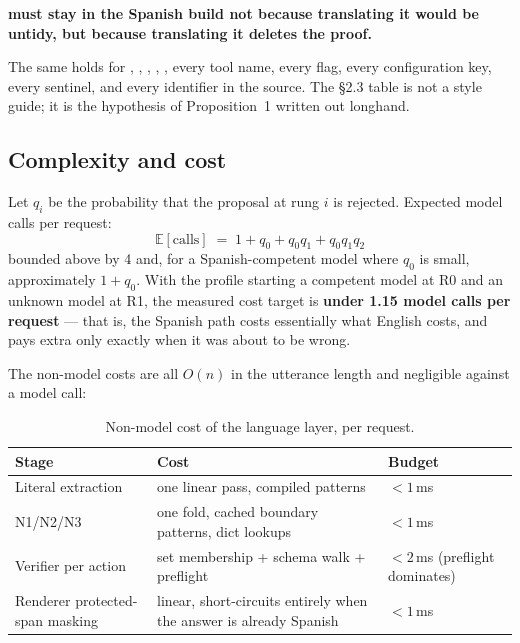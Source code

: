 \begin{keyinsight}
\textbf{ must stay  in the Spanish build not because
translating it would be untidy, but because translating it deletes the proof.}
\end{keyinsight}

The same holds for , , ,
, , every tool name, every flag, every
configuration key, every sentinel, and every identifier in the source. The
\S2.3 table is not a style guide; it is the hypothesis of Proposition~1 written
out longhand.

\subsection{Complexity and cost}
\label{sec:complexity-and-cost}

Let $q_i$ be the probability that the proposal at rung $i$ is rejected. Expected
model calls per request:
\[
  \mathbb{E}[\text{calls}] \;=\; 1 + q_{0} + q_{0}q_{1} + q_{0}q_{1}q_{2}
\]
bounded above by 4 and, for a Spanish-competent model where $q_0$ is small,
approximately $1 + q_0$. With the profile starting a competent model at R0 and
an unknown model at R1, the measured cost target is \textbf{under 1.15 model
calls per request} --- that is, the Spanish path costs essentially what English
costs, and pays extra only exactly when it was about to be wrong.

The non-model costs are all $O(n)$ in the utterance length and negligible
against a model call:

\begin{table}[htbp]
\centering
\small
\caption{Non-model cost of the language layer, per request.}
\label{tab:nepantla-cost}
\begin{tabular}{@{}>{\raggedright\arraybackslash}p{}
                  >{\raggedright\arraybackslash}p{}
                  >{\raggedright\arraybackslash}p{}@{}}
\toprule
\textbf{Stage} & \textbf{Cost} & \textbf{Budget} \\
\midrule
Literal extraction & one linear pass, compiled patterns & $<1$\,ms \\
N1/N2/N3 & one fold, cached boundary patterns, dict lookups & $<1$\,ms \\
Verifier per action & set membership + schema walk + preflight &
  $<2$\,ms (preflight dominates) \\
Renderer protected-span masking & linear, short-circuits entirely when the
  answer is already Spanish & $<1$\,ms \\
\bottomrule
\end{tabular}
\end{table}

